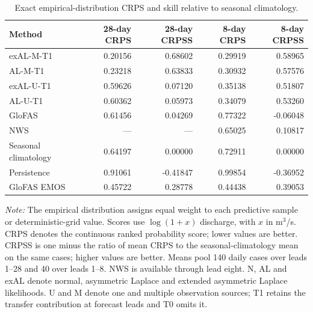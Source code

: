 \begin{table}[!htbp]
\centering
\begin{threeparttable}
\caption{Exact empirical-distribution CRPS and skill relative to seasonal climatology.}
\label{tab:no_refit_scores}
\fontsize{8.5}{10.5}\selectfont
\setlength{\tabcolsep}{4pt}
\begin{tabular}{lrrrr}
\hline
Method & 28-day CRPS & 28-day CRPSS & 8-day CRPS & 8-day CRPSS \\
\hline
exAL-M-T1 & 0.20156 & 0.68602 & 0.29919 & 0.58965 \\
AL-M-T1 & 0.23218 & 0.63833 & 0.30932 & 0.57576 \\
exAL-U-T1 & 0.59626 & 0.07120 & 0.35138 & 0.51807 \\
AL-U-T1 & 0.60362 & 0.05973 & 0.34079 & 0.53260 \\
GloFAS & 0.61456 & 0.04269 & 0.77322 & -0.06048 \\
NWS & --- & --- & 0.65025 & 0.10817 \\
Seasonal climatology & 0.64197 & 0.00000 & 0.72911 & 0.00000 \\
Persistence & 0.91061 & -0.41847 & 0.99854 & -0.36952 \\
GloFAS EMOS & 0.45722 & 0.28778 & 0.44438 & 0.39053 \\
\hline
\end{tabular}
\begin{tablenotes}
\fontsize{8}{10}\selectfont
\item \textit{Note:} The empirical distribution assigns equal weight to each predictive sample or deterministic-grid value. Scores use $\log(1+x)$ discharge, with $x$ in m$^3$/s. CRPS denotes the continuous ranked probability score; lower values are better. CRPSS is one minus the ratio of mean CRPS to the seasonal-climatology mean on the same cases; higher values are better. Means pool 140 daily cases over leads 1--28 and 40 over leads 1--8. NWS is available through lead eight. N, AL and exAL denote normal, asymmetric Laplace and extended asymmetric Laplace likelihoods. U and M denote one and multiple observation sources; T1 retains the transfer contribution at forecast leads and T0 omits it.
\end{tablenotes}
\end{threeparttable}
\end{table}

